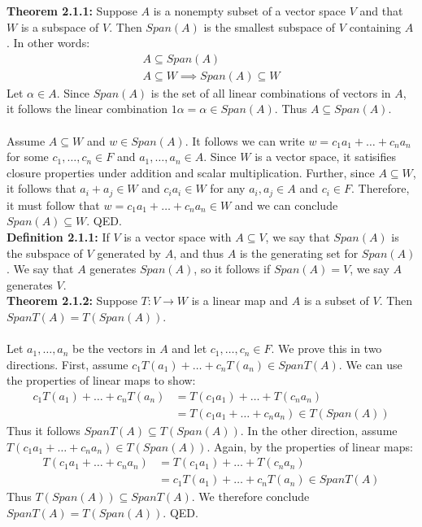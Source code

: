 \documentclass[11pt]{article}
\begin{document}
\textbf{Theorem 2.1.1:} Suppose $A$ is a nonempty subset of a vector space $V$ and that $W$ is a subspace of $V$. Then $Span(A)$ is the smallest subspace of $V$ containing $A$. In other words:
\begin{gather*}
    A \subseteq Span(A) \\
    A \subseteq W \implies Span(A) \subseteq W
\end{gather*}
Let $\alpha \in A$. Since $Span(A)$ is the set of all linear combinations of vectors in $A$, it follows the linear combination $1 \alpha = \alpha \in Span(A)$. Thus $A \subseteq Span(A)$. \\
\vspace{0.1cm} \\
Assume $A \subseteq W$ and $w \in Span(A)$. It follows we can write $w = c_1 a_1 + \dots + c_n a_n$ for some $c_1, \dots, c_n \in F$ and $a_1, \dots, a_n \in A$. Since $W$ is a vector space, it satisifies closure properties under addition and scalar multiplication. Further, since $A \subseteq W$, it follows that $a_i + a_j \in W$ and $c_i a_i \in W$ for any $a_i, a_j \in A$ and $c_i \in F$. Therefore, it must follow that $w = c_1 a_1 + \dots + c_n a_n \in W$ and we can conclude $Span(A) \subseteq W$. QED. \\
\textbf{Definition 2.1.1:} If $V$ is a vector space with $A \subseteq V$, we say that $Span(A)$ is the subspace of $V$ generated by $A$, and thus $A$ is the generating set for $Span(A)$. We say that $A$ generates $Span(A)$, so it follows if $Span(A) = V$, we say $A$ generates $V$. \\
\textbf{Theorem 2.1.2:} Suppose $T : V \rightarrow W$ is a linear map and $A$ is a subset of $V$. Then $SpanT(A) = T(Span(A))$. \\
\vspace{0.1cm} \\
Let $a_1 , \dots , a_n$ be the vectors in $A$ and let $c_1 , \dots , c_n \in F$. We prove this in two directions. First, assume $c_1 T(a_1) + \dots + c_n T(a_n) \in SpanT(A)$. We can use the properties of linear maps to show:
\begin{align*}
    c_1 T(a_1) + \dots + c_n T(a_n) &= T(c_1 a_1) + \dots + T(c_n a_n) \\
    &= T(c_1 a_1 + \dots + c_n a_n) \in T(Span(A))
\end{align*}
Thus it follows $SpanT(A) \subseteq T(Span(A))$. In the other direction, assume $T(c_1 a_1 + \dots + c_n a_n) \in T(Span(A))$. Again, by the properties of linear maps:
\begin{align*}
    T(c_1 a_1 + \dots + c_n a_n) &= T(c_1 a_1) + \dots + T(c_n a_n) \\
    &= c_1 T(a_1) + \dots + c_n T(a_n) \in SpanT(A)
\end{align*}
Thus $T(Span(A)) \subseteq SpanT(A)$. We therefore conclude $SpanT(A) = T(Span(A))$. QED.
\end{document}
